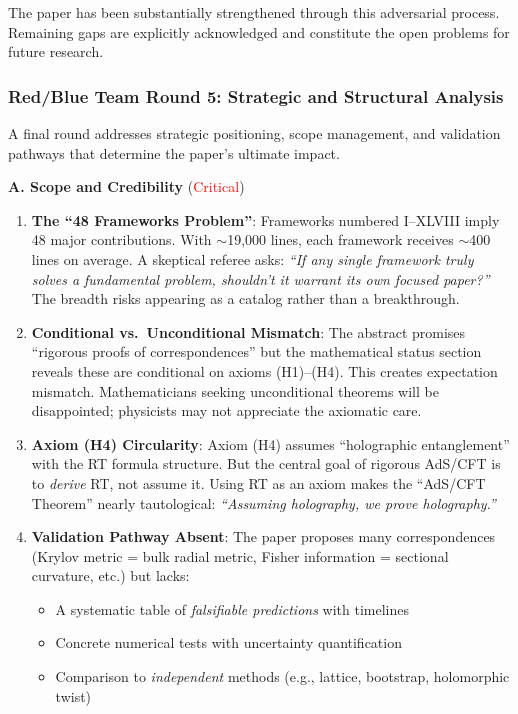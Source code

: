 \documentclass[12pt,a4paper]{article}
\begin{document}
The paper has been substantially strengthened through this adversarial process. Remaining gaps are explicitly acknowledged and constitute the open problems for future research.

\subsubsection{Red/Blue Team Round 5: Strategic and Structural Analysis}
\label{subsubsec:red-blue-round5}

A final round addresses strategic positioning, scope management, and validation pathways that determine the paper's ultimate impact.

\begin{tcolorbox}[colback=red!5!white, colframe=red!75!black, title=\textbf{RED TEAM Round 5: Strategic Critiques}]

\textbf{A. Scope and Credibility} (\textcolor{red}{Critical})

\begin{enumerate}[label=\textbf{R5.\arabic*.}]
    \item \textbf{The ``48 Frameworks Problem''}: Frameworks numbered I--XLVIII imply 48 major contributions. With $\sim$19,000 lines, each framework receives $\sim$400 lines on average. A skeptical referee asks: \emph{``If any single framework truly solves a fundamental problem, shouldn't it warrant its own focused paper?''} The breadth risks appearing as a catalog rather than a breakthrough.
    
    \item \textbf{Conditional vs.\ Unconditional Mismatch}: The abstract promises ``rigorous proofs of correspondences'' but the mathematical status section reveals these are conditional on axioms (H1)--(H4). This creates expectation mismatch. Mathematicians seeking unconditional theorems will be disappointed; physicists may not appreciate the axiomatic care.
    
    \item \textbf{Axiom (H4) Circularity}: Axiom (H4) assumes ``holographic entanglement'' with the RT formula structure. But the central goal of rigorous AdS/CFT is to \emph{derive} RT, not assume it. Using RT as an axiom makes the ``AdS/CFT Theorem'' nearly tautological: \emph{``Assuming holography, we prove holography.''}
    
    \item \textbf{Validation Pathway Absent}: The paper proposes many correspondences (Krylov metric = bulk radial metric, Fisher information = sectional curvature, etc.) but lacks:
    \begin{itemize}
        \item A systematic table of \emph{falsifiable predictions} with timelines
        \item Concrete numerical tests with uncertainty quantification
        \item Comparison to \emph{independent} methods (e.g., lattice, bootstrap, holomorphic twist)
    \end{itemize}
\end{enumerate}


\end{tcolorbox}
\end{document}
